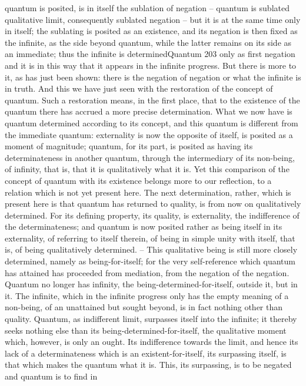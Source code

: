 quantum is posited, is in itself the sublation of negation – quantum is
sublated qualitative limit, consequently sublated negation – but it is at the
same time only in itself; the sublating is posited as an existence, and its
negation is then fixed as the infinite, as the side beyond quantum, while the
latter remains on its side as an immediate; thus the infinite is determinedQuantum
203
only as first negation and it is in this way that it appears in the infinite
progress. But there is more to it, as has just been shown: there is the negation
of negation or what the infinite is in truth. And this we have just seen with
the restoration of the concept of quantum. Such a restoration means, in
the first place, that to the existence of the quantum there has accrued a
more precise determination. What we now have is quantum determined
according to its concept, and this quantum is different from the immediate
quantum: externality is now the opposite of itself, is posited as a moment of
magnitude; quantum, for its part, is posited as having its determinateness in
another quantum, through the intermediary of its non-being, of infinity,
that is, that it is qualitatively what it is. Yet this comparison of the concept
of quantum with its existence belongs more to our reflection, to a relation
which is not yet present here. The next determination, rather, which is
present here is that quantum has returned to quality, is from now on
qualitatively determined. For its defining property, its quality, is externality,
the indifference of the determinateness; and quantum is now posited rather
as being itself in its externality, of referring to itself therein, of being in
simple unity with itself, that is, of being qualitatively determined. – This
qualitative being is still more closely determined, namely as being-for-itself;
for the very self-reference which quantum has attained has proceeded from
mediation, from the negation of the negation. Quantum no longer has
infinity, the being-determined-for-itself, outside it, but in it.
The infinite, which in the infinite progress only has the empty meaning
of a non-being, of an unattained but sought beyond, is in fact nothing
other than quality. Quantum, as indifferent limit, surpasses itself into the
infinite; it thereby seeks nothing else than its being-determined-for-itself,
the qualitative moment which, however, is only an ought. Its indifference
towards the limit, and hence its lack of a determinateness which is an
existent-for-itself, its surpassing itself, is that which makes the quantum
what it is. This, its surpassing, is to be negated and quantum is to find in
